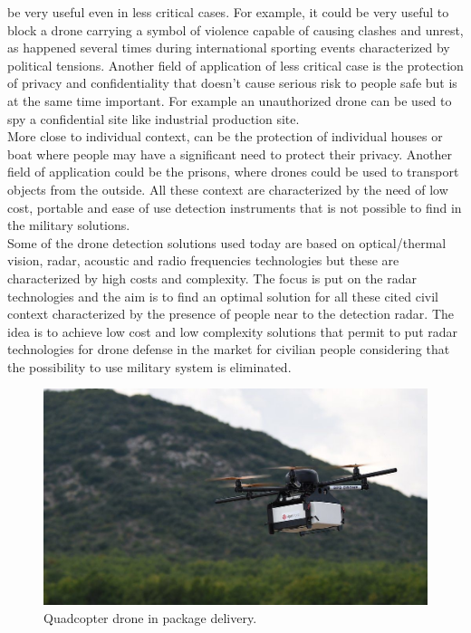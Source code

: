 be very useful even in less critical cases. For example, it could be very useful to block a drone carrying a symbol of violence capable of causing clashes and unrest, as happened several times during international sporting events characterized by political tensions. Another field of application of less critical case is the protection of privacy and confidentiality that doesn't cause serious risk to people safe but is at the same time important. For example an unauthorized drone can be used to spy a confidential site like industrial production site.\\ More close to individual context, can be the protection of individual houses or boat where people may have a significant need to protect their privacy. Another field of application could be the prisons, where drones could be used to transport objects from the outside. All these context are characterized by the need of low cost, portable and ease of use detection instruments that is not possible to find in the military solutions.\\ Some of the drone detection solutions used today are based on optical/thermal vision, radar, acoustic and radio frequencies technologies but these are characterized by high costs and complexity. The focus is put on the radar technologies and the aim is to find an optimal solution for all these cited civil context characterized by the presence of people near to the detection radar. The idea is to achieve low cost and low complexity solutions that permit to put radar technologies for drone defense in the market for civilian people considering that the possibility to use military system is eliminated.

\begin{figure}[h!]
    \centering
    \includegraphics[width=12cm]{imgs/Drone delivery.jpg}
    \caption{Quadcopter drone in package delivery.}
\end{figure}




